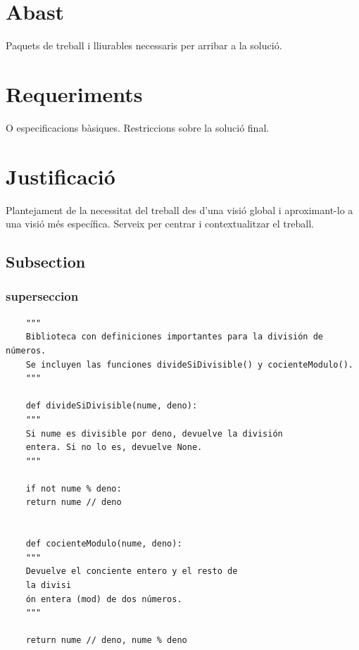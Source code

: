 \section{Abast}

Paquets de treball i lliurables necessaris per arribar a la solució.

\section{Requeriments}

O especificacions bàsiques. Restriccions sobre la solució final.

\section{Justificació}

Plantejament de la necessitat del treball des d’una visió global i aproximant-lo a una visió més específica. Serveix per centrar i contextualitzar el treball.


\subsection{Subsection}

\subsubsection{superseccion}

\begin{verbatim}
	"""
	Biblioteca con definiciones importantes para la división de números.
	Se incluyen las funciones divideSiDivisible() y cocienteModulo().
	"""
	
	def divideSiDivisible(nume, deno):
	"""
	Si nume es divisible por deno, devuelve la división
	entera. Si no lo es, devuelve None.
	"""
	
	if not nume % deno:
	return nume // deno
	
	
	def cocienteModulo(nume, deno):
	"""
	Devuelve el conciente entero y el resto de
	la divisi
	ón entera (mod) de dos números.
	"""
	
	return nume // deno, nume % deno
	
\end{verbatim}


\inputminted[label={src/divisions.py},firstline=6,lastline=13]{python}{src/divisions.py}

